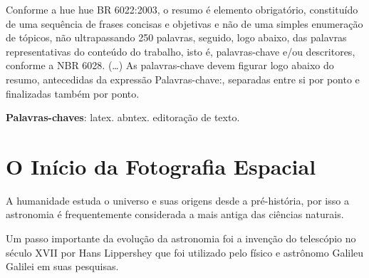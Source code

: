 \documentclass[
	article,			%
	12pt,				%
	oneside,			%
	a4paper,			%
	english,			%
	brazil,				%
	sumario=tradicional
	]{abntex2}
\begin{document}
\frenchspacing 


%
%
\maketitle

\begin{resumoumacoluna}
 Conforme a hue hue BR 6022:2003, o resumo é elemento obrigatório, constituído de
 uma sequência de frases concisas e objetivas e não de uma simples enumeração
 de tópicos, não ultrapassando 250 palavras, seguido, logo abaixo, das palavras
 representativas do conteúdo do trabalho, isto é, palavras-chave e/ou
 descritores, conforme a NBR 6028. (\ldots) As palavras-chave devem figurar logo
 abaixo do resumo, antecedidas da expressão Palavras-chave:, separadas entre si por
 ponto e finalizadas também por ponto.
 
 \vspace{\onelineskip}
 
 \noindent
 \textbf{Palavras-chaves}: latex. abntex. editoração de texto.
\end{resumoumacoluna}

\textual{}

\section{O Início da Fotografia Espacial}

A humanidade estuda o universo e suas origens desde a pré-história, por isso a 
astronomia é frequentemente considerada a mais antiga das ciências naturais.
~\cite{astronomiaantiga}

Um passo importante da evolução da astronomia foi a invenção do telescópio no 
século XVII por Hans Lippershey que foi utilizado pelo físico e astrônomo
Galileu Galilei em suas pesquisas.~\cite{ronan1987historia}
\end{document}

